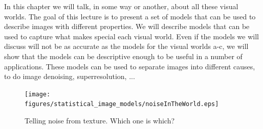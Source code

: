 %
%
%
%
In this chapter we will talk, in some way or another, about all these visual worlds. The goal of this lecture is to present a set of models that can be used to describe images with different properties. We will describe models that can be used to capture what makes special each visual world. Even if the models we will discuss will not be as accurate as the models for the visual worlds a-c, we will show that the models can be descriptive enough to be useful in a number of applications.  These models can be used to separate images into different causes, to do image denoising, superresolution, ...




\begin{figure}[htpb]
\centerline{
\texttt{[image: figures/statistical\_image\_models/noiseInTheWorld.eps]}
} 
\caption{Telling noise from texture. Which one is which?} 
\label{fig:noiseInTheWorld}
\end{figure}





% 

